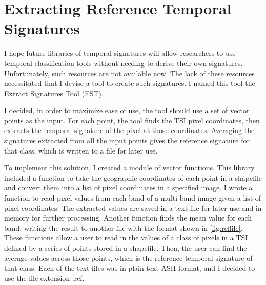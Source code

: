 \section{Extracting Reference Temporal Signatures}
\label{appendix:tools:extract}

I hope future libraries of temporal signatures will allow researchers to use temporal classification tools without needing to derive their own signatures. Unfortunately, such resources are not available now. The lack of these resources necessitated that I devise a tool to create such signatures. I named this tool the Extract Signatures Tool (EST).

I decided, in order to maximize ease of use, the tool should use a set of vector points as the input. For each point, the tool finds the TSI pixel coordinates, then extracts the temporal signature of the pixel at those coordinates. Averaging the signatures extracted from all the input points gives the reference signature for that class, which is written to a file for later use.

To implement this solution, I created a module of vector functions. This library included a function to take the geographic coordinates of each point in a shapefile and convert them into a list of pixel coordinates in a specified image. I wrote a function to read pixel values from each band of a multi-band image given a list of pixel coordinates. The extracted values are saved in a text file for later use and in memory for further processing. Another function finds the mean value for each band, writing the result to another file with the format shown in \autoref{fig:reffile}. These functions allow a user to read in the values of a class of pixels in a TSI defined by a series of points stored in a shapefile. Then, the user can find the average values across those points, which is the reference temporal signature of that class. Each of the text files was in plain-text ASII format, and I decided to use the file extension .ref.

